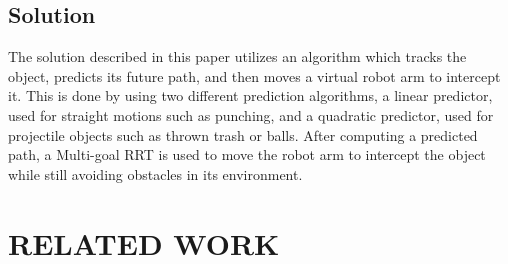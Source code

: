 \documentclass[letterpaper, 10 pt, conference]{ieeeconf}  %
\begin{document}
\subsection{Solution}

The solution described in this paper utilizes an algorithm which tracks the
object, predicts its future path, and then moves a virtual robot arm to
intercept it. This is done by using two different prediction
algorithms, a linear predictor, used for straight motions such as punching, and a
quadratic predictor, used for projectile objects such as thrown trash or balls. After
computing a predicted path, a Multi-goal RRT is used to move the robot arm to
intercept the object while still avoiding obstacles in its environment.



\section{RELATED WORK}
\end{document}
